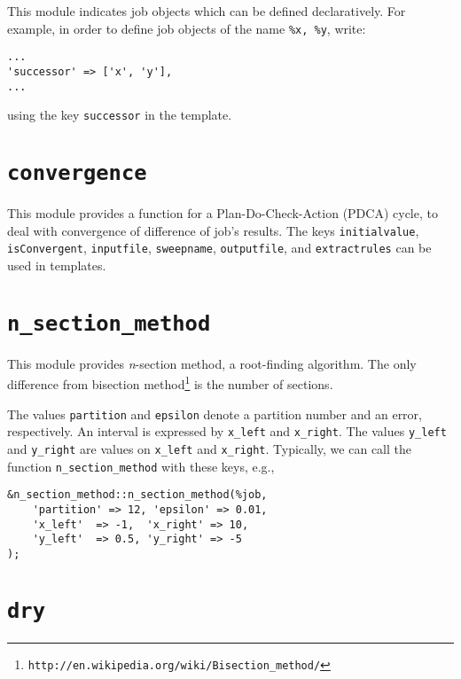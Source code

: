 \documentclass[a4paper,10pt]{report}
\begin{document}
This module indicates job objects which can be defined declaratively.
For example, in order to define job objects of the name \texttt{\%x,
\%y}, write:
\begin{boxnote}
\begin{verbatim}
...
'successor' => ['x', 'y'],
...
\end{verbatim}
\end{boxnote}
\vspace{\baselineskip}
\noindent
using the key \texttt{successor} in the template.

\section{\texttt{convergence}}

This module provides a function for a Plan-Do-Check-Action (PDCA)
cycle, to deal with convergence of difference of job's results.  The
keys \texttt{initialvalue}, \texttt{isConvergent}, \texttt{inputfile},
\texttt{sweepname}, \texttt{outputfile}, and \texttt{extractrules} can
be used in templates.

\section{\texttt{n\_section\_method}}

This module provides \textit{n}-section method, a root-finding
algorithm. The only difference from bisection
method\footnote{\texttt{http://en.wikipedia.org/wiki/Bisection\_method/}}
is the number of sections.

The values \texttt{partition} and \texttt{epsilon} denote
    a partition number and an error, respectively.  An interval is
    expressed by \texttt{x\_left} and \texttt{x\_right}.  The values
    \texttt{y\_left} and \texttt{y\_right} are values on \texttt{x\_left}
    and \texttt{x\_right}.  Typically, we can call the function
    \texttt{n\_section\_method} with these keys, e.g.,
\begin{boxnote}
\begin{verbatim}
&n_section_method::n_section_method(%job,
    'partition' => 12, 'epsilon' => 0.01,
    'x_left'  => -1,  'x_right' => 10,
    'y_left'  => 0.5, 'y_right' => -5
);
\end{verbatim}
\end{boxnote}

\section{\texttt{dry}}
\end{document}
